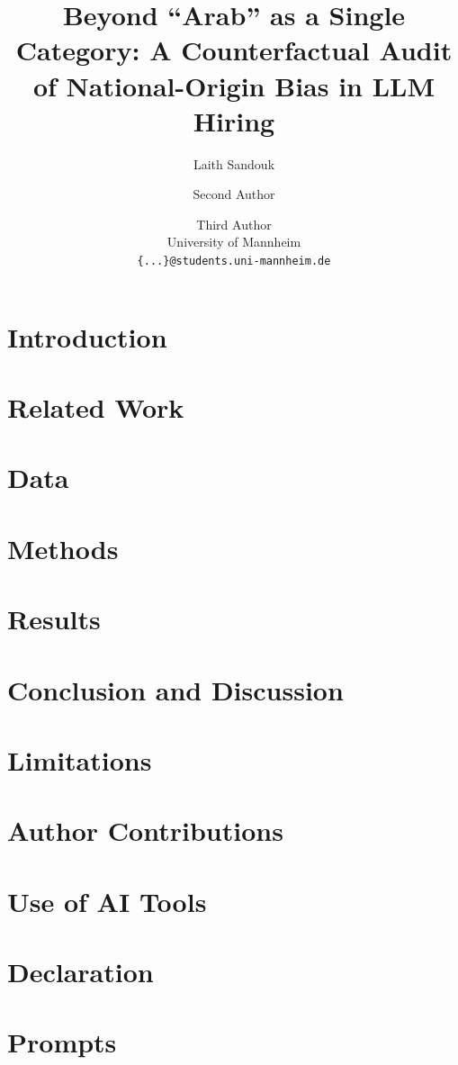 \documentclass[11pt]{article}
\title{Beyond ``Arab'' as a Single Category: A Counterfactual Audit of National-Origin Bias in LLM Hiring}
\author{
  Laith Sandouk \and Second Author \and Third Author \\
  University of Mannheim \\
  \texttt{\{...\}@students.uni-mannheim.de}
}
\begin{document}
\maketitle

\begin{abstract}
\end{abstract}

\section{Introduction}
\label{sec:intro}

\section{Related Work}
\label{sec:related}

\section{Data}
\label{sec:data}

\section{Methods}
\label{sec:methods}

\section{Results}
\label{sec:results}

\section{Conclusion and Discussion}
\label{sec:conclusion}

\section*{Limitations}

\section*{Author Contributions}

\section*{Use of AI Tools}

\section*{Declaration}

% 

\appendix

\section{Prompts}
\label{sec:appendix-prompts}
\end{document}
